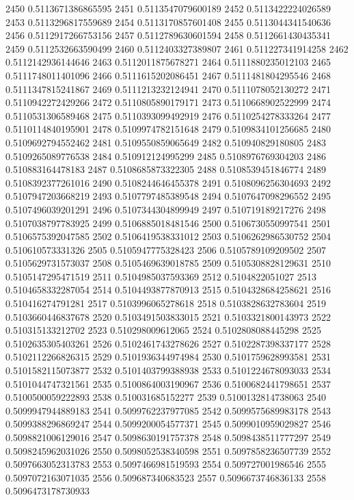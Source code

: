 2450 0.5113671386865595
2451 0.5113547079600189
2452 0.5113422224026589
2453 0.5113296817559689
2454 0.5113170857601408
2455 0.5113044341540636
2456 0.5112917266753156
2457 0.5112789630601594
2458 0.5112661430435341
2459 0.5112532663590499
2460 0.5112403327389807
2461 0.511227341914258
2462 0.5112142936144646
2463 0.5112011875678271
2464 0.5111880235012103
2465 0.5111748011401096
2466 0.5111615202086451
2467 0.5111481804295546
2468 0.5111347815241867
2469 0.5111213232124941
2470 0.5111078052130272
2471 0.5110942272429266
2472 0.5110805890179171
2473 0.5110668902522999
2474 0.5110531306589468
2475 0.5110393099492919
2476 0.5110254278333264
2477 0.5110114840195901
2478 0.5109974782151648
2479 0.5109834101256685
2480 0.5109692794552462
2481 0.5109550859065649
2482 0.510940829180805
2483 0.5109265089776538
2484 0.510912124995299
2485 0.5108976769304203
2486 0.510883164478183
2487 0.5108685873322305
2488 0.5108539451846774
2489 0.5108392377261016
2490 0.5108244646455378
2491 0.5108096256304693
2492 0.5107947203668219
2493 0.5107797485389548
2494 0.5107647098296552
2495 0.5107496039201291
2496 0.5107344304899949
2497 0.510719189217276
2498 0.5107038797783925
2499 0.5106885018481546
2500 0.5106730550997541
2501 0.5106575392047585
2502 0.5106419538331012
2503 0.5106262986530752
2504 0.510610573331326
2505 0.5105947775328423
2506 0.5105789109209502
2507 0.5105629731573037
2508 0.5105469639018785
2509 0.5105308828129631
2510 0.5105147295471519
2511 0.5104985037593369
2512 0.5104822051027
2513 0.5104658332287054
2514 0.5104493877870913
2515 0.5104328684258621
2516 0.510416274791281
2517 0.5103996065278618
2518 0.5103828632783604
2519 0.5103660446837678
2520 0.5103491503833015
2521 0.5103321800143973
2522 0.510315133212702
2523 0.510298009612065
2524 0.5102808088445298
2525 0.5102635305403261
2526 0.5102461743278626
2527 0.5102287398337177
2528 0.5102112266826315
2529 0.5101936344974984
2530 0.5101759628993581
2531 0.5101582115073877
2532 0.5101403799388938
2533 0.5101224678093033
2534 0.5101044747321561
2535 0.5100864003190967
2536 0.5100682441798651
2537 0.5100500059222893
2538 0.510031685152277
2539 0.5100132814738063
2540 0.5099947944889183
2541 0.5099762237977085
2542 0.5099575689983178
2543 0.5099388296869247
2544 0.5099200054577371
2545 0.5099010959029827
2546 0.5098821006129016
2547 0.5098630191757378
2548 0.5098438511777297
2549 0.5098245962031026
2550 0.5098052538340598
2551 0.5097858236507739
2552 0.5097663052313783
2553 0.5097466981519593
2554 0.509727001986546
2555 0.5097072163071035
2556 0.509687340683523
2557 0.5096673746836133
2558 0.5096473178730933
